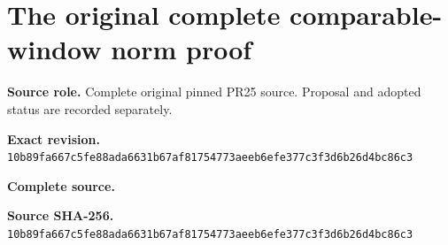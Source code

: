 \begingroup
\sloppy
\small
\clearpage
\section{The original complete comparable-window norm proof}
\noindent\textbf{Source role.} Complete original pinned PR25 source. Proposal and adopted status are recorded separately.\par
\noindent\textbf{Exact revision.} \nolinkurl{10b89fa667c5fe88ada6631b67af81754773aeeb6efe377c3f3d6b26d4bc86c3}\par
\noindent\textbf{Complete source.} \par
\noindent\textbf{Source SHA-256.} \nolinkurl{10b89fa667c5fe88ada6631b67af81754773aeeb6efe377c3f3d6b26d4bc86c3}\par\medskip

\endgroup
